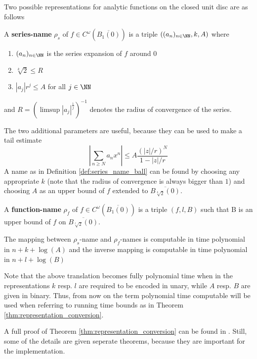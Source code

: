 	 Two possible representations for analytic functions on the closed unit disc are as follows
	 \begin{definition}\label{def:series_name_ball}
	 	A \textbf{series-name} $\rho_s$ of $f \in C^\omega(\overline{B_1(0)})$ is a triple $((a_n)_{n \in \NN}, k, A)$ where 
	 	\begin{enumerate}
	 		\item $(a_n)_{n \in \NN}$ is the series expansion of $f$ around $0$
	 		\item $\sqrt[k]{2} \leq R$ 
	 		\item $|a_j|r^j \leq A$ for all $j \in \NN$
	 	\end{enumerate}
	 	and $R = (\limsup |a_j|^{\frac{1}{j}})^{-1}$ denotes the radius of convergence of the series.
	 \end{definition}
	 The two additional parameters are useful, because they can be used to make a tail estimate 
	 \begin{equation}\label{eqn:tail_estimate}
	  \left | \sum_{n \geq N} a_nx^n \right | \leq A \frac{(|z|/r)^N}{1-|z|/r}
	 \end{equation}
	 A name as in Definition \ref{def:series_name_ball} can be found by choosing any appropriate $k$ (note that the radius of convergence is always bigger than $1$) and choosing $A$ as an upper bound of $f$ extended to $\overline{B_{\sqrt[k]{2}}(0)}$. 
	 \begin{definition}\label{def: function name ball}
	 	A \textbf{function-name} $\rho_f$ of $f \in C^\omega(\overline{B_1(0)})$ is a triple $(f, l, B)$ such that
		B is an upper bound of $f$ on $\overline{B_{\sqrt[l]{2}}(0)}$.
	 \end{definition}
	 \begin{theorem}\cite{Kaw}\label{thm:representation_conversion}
	 	The mapping between $\rho_s$-name and $\rho_f$-names is computable in time polynomial in 
	 	$n+k+\log(A)$ and the inverse mapping is computable in time polynomial in $n+l+\log(B)$ 
	 \end{theorem}
	 Note that the above translation becomes fully polynomial time when in the representations $k$ resp. $l$ are required to be encoded in unary, while $A$ resp. $B$ are given in binary.
	 Thus, from now on the term polynomial time computable will be used when referring to running time bounds as in Theorem \ref{thm:representation_conversion}.

	 A full proof of Theorem \ref{thm:representation_conversion} can be found in \cite{Kaw}. 
   Still, some of the details are given seperate theorems, because they are important for the implementation.

